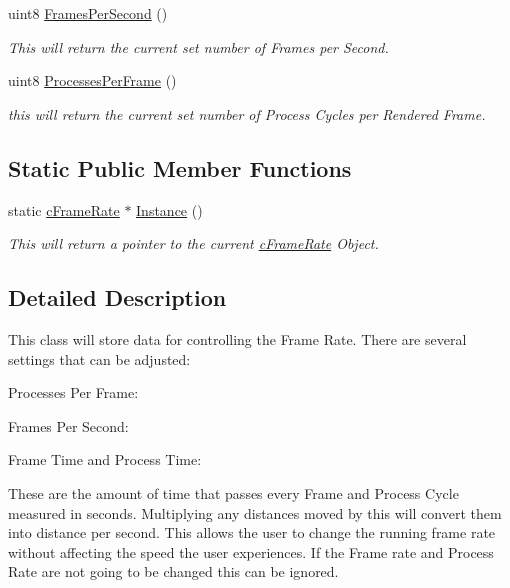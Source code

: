 \begin{DoxyCompactItemize}
uint8 \hyperlink{classc_frame_rate_ab450d4c204172469695433474227bd19}{FramesPerSecond} ()
\begin{DoxyCompactList}\small\item\em This will return the current set number of Frames per Second. \item\end{DoxyCompactList}\item 
uint8 \hyperlink{classc_frame_rate_ab1b0bc7a9801cbea5d8036203a0a9ee4}{ProcessesPerFrame} ()
\begin{DoxyCompactList}\small\item\em this will return the current set number of Process Cycles per Rendered Frame. \item\end{DoxyCompactList}\end{DoxyCompactItemize}
\subsection*{Static Public Member Functions}
\begin{DoxyCompactItemize}
\item 
static \hyperlink{classc_frame_rate}{cFrameRate} $\ast$ \hyperlink{classc_frame_rate_a843b42d98bb70a1bc566a367b47d7fc3}{Instance} ()
\begin{DoxyCompactList}\small\item\em This will return a pointer to the current \hyperlink{classc_frame_rate}{cFrameRate} Object. \item\end{DoxyCompactList}\end{DoxyCompactItemize}


\subsection{Detailed Description}
This class will store data for controlling the Frame Rate. There are several settings that can be adjusted:\par
 Processes Per Frame:\par
 \par
 Frames Per Second:\par
 \par
 Frame Time and Process Time:\par
 These are the amount of time that passes every Frame and Process Cycle measured in seconds. Multiplying any distances moved by this will convert them into distance per second. This allows the user to change the running frame rate without affecting the speed the user experiences. If the Frame rate and Process Rate are not going to be changed this can be ignored. 

